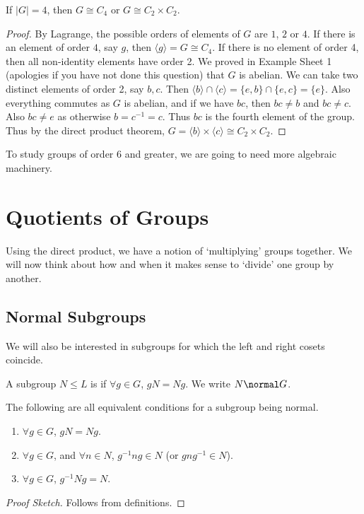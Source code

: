 \documentclass[a4]{scrreprt}
\newcommand{\newchapter}{\chapter}
\newcommand{\newsection}{\section}
\begin{document}
\begin{proposition}
	If $|G| = 4$, then $G \cong C_4$ or $G \cong C_2 \times C_2$.
\end{proposition}
\begin{proof}
	By Lagrange, the possible orders of elements of $G$ are $1$, $2$ or $4$. If there is an element of order $4$, say $g$, then $\langle g \rangle = G \cong C_4$. If there is no element of order 4, then all non-identity elements have order 2. We proved in Example Sheet 1 (apologies if you have not done this question) that $G$ is abelian. We can take two distinct elements of order 2, say $b, c$. Then $\langle b \rangle \cap \langle c \rangle = \{e, b\} \cap \{e, c\} = \{e\}$. Also everything commutes as $G$ is abelian, and if we have $bc$, then $bc \neq b$ and $bc \neq c$. Also $bc \neq e$ as otherwise $b = c^{-1} = c$. Thus $bc$ is the fourth element of the group. Thus by the direct product theorem, $G = \langle b \rangle \times \langle c \rangle \cong C_2 \times C_2$.
\end{proof}

To study groups of order $6$ and greater, we are going to need more algebraic machinery.
 
\newchapter{Quotients of Groups}

Using the direct product, we have a notion of `multiplying' groups together. We will now think about how and when it makes sense to `divide' one group by another. 

\newsection{Normal Subgroups}

We will also be interested in subgroups for which the left and right cosets coincide.

\begin{definition}
	A subgroup $N \leq L$ is  if $\forall g \in G$, $gN = Ng$. We write $N \normal G$.
\end{definition}

\begin{proposition}
	The following are all equivalent conditions for a subgroup being normal.
	\begin{enumerate}[label=(\roman*)]
		\item $\forall g \in G$, $gN = Ng$.
		\item $\forall g \in G$, and $\forall n \in N$, $g^{-1} n g \in N$ (or $g n g^{-1} \in N$).
		\item $\forall g \in G$, $g^{-1} N g = N$.
	\end{enumerate}
\end{proposition}
\begin{proof}[Proof Sketch]
	Follows from definitions.
\end{proof}
\end{document}
